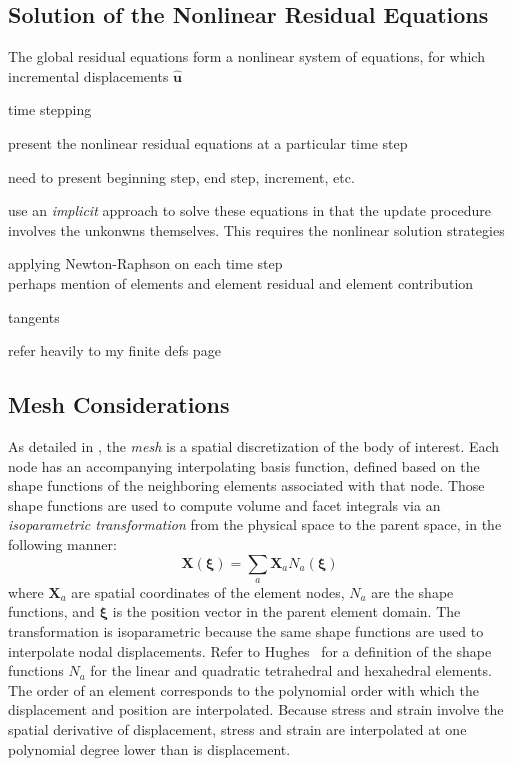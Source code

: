 \subsection{Solution of the Nonlinear Residual Equations}

The global residual equations form a nonlinear system of equations, for which incremental displacements $\hat{\bm{u}}$ 

time stepping 

present the nonlinear residual equations at a particular time step

need to present beginning step, end step, increment, etc.

use an \textit{implicit} approach to solve these equations in that the update procedure involves the unkonwns themselves. This requires the nonlinear solution strategies

applying Newton-Raphson on each time step \\

perhaps mention of elements and element residual and element contribution

tangents

refer heavily to my finite defs page

\subsection{Mesh Considerations}

As detailed in , the \textit{mesh} is a spatial discretization of the body of interest. Each node has an accompanying interpolating basis function, defined based on the shape functions of the neighboring elements associated with that node. Those shape functions are used to compute volume and facet integrals via an \textit{isoparametric transformation} from the physical space to the parent space, in the following manner:
\begin{equation}
\bm{X}(\bm{\xi}) = \sum\limits_{a}\bm{X}_a{N}_a(\bm{\xi})
\end{equation}
where $\bm{X}_a$ are spatial coordinates of the element nodes, $N_a$ are the shape functions, and $\bm{\xi}$ is the position vector in the parent element domain. The transformation is isoparametric because the same shape functions are used to interpolate nodal displacements. Refer to Hughes~\cite{} for a definition of the shape functions $N_a$ for the linear and quadratic tetrahedral and hexahedral elements. The order of an element corresponds to the polynomial order with which the displacement and position are interpolated. Because stress and strain involve the spatial derivative of displacement, stress and strain are interpolated at one polynomial degree lower than is displacement. 


